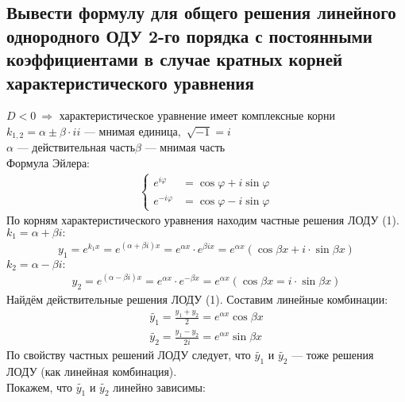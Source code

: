 \subsection{Вывести формулу для общего решения линейного однородного ОДУ 2-го порядка с постоянными коэффициентами в случае кратных корней характеристического уравнения}

 $D< 0\ \Rightarrow$ характеристическое уравнение имеет комплексные корни\\
$k_{1,2} = \alpha \pm \beta \cdot i$\qquad $i$ --- мнимая единица,\ $\sqrt{-1} = i$ \\
$\alpha$ --- действительная часть\qquad $\beta$ --- мнимая часть \\
Формула Эйлера:
\begin{gather*}
    \left\{ \begin{aligned}
        e^{i\varphi} &= \cos \varphi + i \sin \varphi \\
        e^{-i \varphi} &= \cos \varphi - i \sin \varphi
    \end{aligned} \right.
\end{gather*}
По корням характеристического уравнения находим частные решения ЛОДУ (1). \\
$k_1 = \alpha + \beta i\colon$
\begin{align*}
    y_1 = e^{k_1x} = e^{(\alpha + \beta i)x} = e^{\alpha x}\cdot e^{\beta i x} = \boxed{e^{\alpha x} \left(\cos \beta x + i\cdot \sin \beta x\right)}
\end{align*}
$k_2 = \alpha - \beta i\colon$
\begin{align*}
    y_2 = e^{(\alpha - \beta i)x} = e^{\alpha x} \cdot e^{-\beta x} = \boxed{e^{\alpha x} \left(\cos \beta x = i\cdot \sin \beta x\right)}
\end{align*}
Найдём действительные решения ЛОДУ (1). Составим линейные комбинации:
\begin{align*}
    \widetilde{y_1} = \frac{y_1 + y_2}{2} = e^{\alpha x} \cos \beta x \\
    \widetilde{y_2} = \frac{y_1 - y_2}{2i} = e^{\alpha x} \sin \beta x
\end{align*}
По свойству частных решений ЛОДУ следует, что $\widetilde{y_1}$ и $\widetilde{y_2}$ --- тоже решения ЛОДУ (как линейная комбинация). \\
Покажем, что $\widetilde{y_1}$ и $\widetilde{y_2}$ линейно зависимы:
